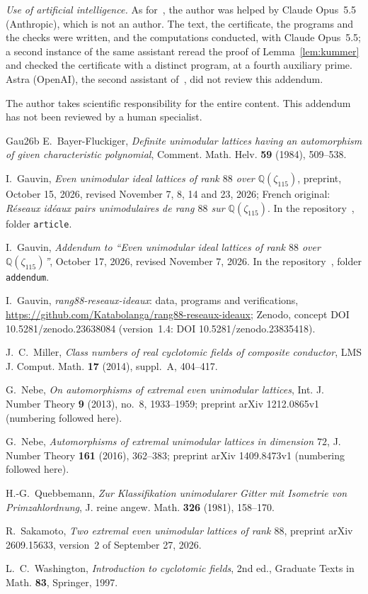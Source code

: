 \documentclass[11pt,a4paper]{amsart}
\theoremstyle{plain}
\theoremstyle{definition}
\newcommand{\Q}{\mathbb{Q}}
\begin{document}
\emph{Use of artificial intelligence.} As for~\cite{Gau26}, the author was helped by Claude Opus~5.5 (Anthropic), which is not an author. The text, the certificate, the programs and the checks were written, and the computations conducted, with Claude Opus~5.5; a second instance of the same assistant reread the proof of Lemma~\ref{lem:kummer} and checked the certificate with a distinct program, at a fourth auxiliary prime. Astra (OpenAI), the second assistant of~\cite{Gau26}, did not review this addendum.

The author takes scientific responsibility for the entire content. This addendum has not been reviewed by a human specialist.

\begin{thebibliography}{Gau26b}
E.~Bayer-Fluckiger, \emph{Definite unimodular lattices having an automorphism of given characteristic polynomial}, Comment. Math. Helv. \textbf{59} (1984), 509--538.

I.~Gauvin, \emph{Even unimodular ideal lattices of rank $88$ over $\Q(\zeta_{115})$}, preprint, October 15, 2026, revised November 7, 8, 14 and 23, 2026; French original: \emph{R\'eseaux id\'eaux pairs unimodulaires de rang $88$ sur $\Q(\zeta_{115})$}. In the repository~\cite{Gau26b}, folder \texttt{article}.

I.~Gauvin, \emph{Addendum to ``Even unimodular ideal lattices of rank $88$ over $\Q(\zeta_{115})$''}, October 17, 2026, revised November 7, 2026. In the repository~\cite{Gau26b}, folder \texttt{addendum}.

I.~Gauvin, \emph{rang88-reseaux-ideaux}: data, programs and verifications, \url{https://github.com/Katabolanga/rang88-reseaux-ideaux}; Zenodo, concept DOI 10.5281/zenodo.23638084 (version~1.4: DOI 10.5281/zenodo.23835418).

J.~C.~Miller, \emph{Class numbers of real cyclotomic fields of composite conductor}, LMS J. Comput. Math. \textbf{17} (2014), suppl.~A, 404--417.

G.~Nebe, \emph{On automorphisms of extremal even unimodular lattices}, Int. J. Number Theory \textbf{9} (2013), no.~8, 1933--1959; preprint arXiv 1212.0865v1 (numbering followed here).

G.~Nebe, \emph{Automorphisms of extremal unimodular lattices in dimension $72$}, J. Number Theory \textbf{161} (2016), 362--383; preprint arXiv 1409.8473v1 (numbering followed here).

H.-G.~Quebbemann, \emph{Zur Klassifikation unimodularer Gitter mit Isometrie von Primzahlordnung}, J. reine angew. Math. \textbf{326} (1981), 158--170.

R.~Sakamoto, \emph{Two extremal even unimodular lattices of rank $88$}, preprint arXiv 2609.15633, version~2 of September 27, 2026.

L.~C.~Washington, \emph{Introduction to cyclotomic fields}, 2nd ed., Graduate Texts in Math. \textbf{83}, Springer, 1997.
\end{thebibliography}
\end{document}
